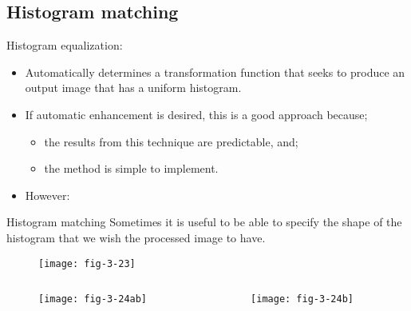 
\subsection{Histogram matching}


\begin{frame}
Histogram equalization:
\begin{itemize}
\item Automatically determines a transformation function that seeks to produce an output image that has a uniform histogram.
\item If automatic enhancement is desired, this is a good approach because;
\begin{itemize}
\item the results from this technique are predictable, and;
\item the method is simple to implement.
\end{itemize}
\item However:
\end{itemize}
\begin{block}{Histogram matching}
Sometimes it is useful to be able to specify the shape of the histogram that we wish the
processed image to have.
\end{block}
\end{frame}



\begin{frame}
\begin{figure}
\centering
\texttt{[image: fig-3-23]}
\end{figure}
\end{frame}


\begin{frame}
\begin{columns}
\begin{column}{.5\textwidth}
\begin{figure}
\centering
\texttt{[image: fig-3-24ab]}
\end{figure}
\end{column}
\begin{column}{.5\textwidth}
\begin{figure}
\centering
\texttt{[image: fig-3-24b]}
\end{figure}
\end{column}
\end{columns}
\end{frame}

